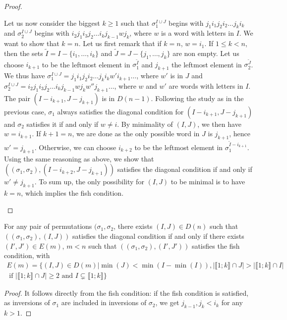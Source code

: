 \begin{proof}
\begin{itemize}
Let us now consider the biggest $k\geq 1$ such that $\sigma^{I \cup J}_1$ begins with $j_1 i_1 j_2 i_2 \ldots j_k i_k$ and $\sigma^{I \cup J}_2$ begins with $i_2 j_1 i_3 j_2\ldots i_k j_{k-1} w j_k$, where $w$ is a word with letters in $I$. We want to show that $k=n$. Let us first remark that if $k=n$, $w=i_1$. If $1\leq k<n$, then the sets $\tilde{I}=I-\{i_1, \ldots, i_k\}$ and $\tilde{J}=J-\{j_1, \ldots, j_k\}$ are non empty. Let us choose $i_{k+1}$ to be the leftmost element in $\sigma^{\tilde{I}}_1$ and $j_{k+1}$ the leftmost element in $\sigma^{\tilde{J}}_2$. We thus have $\sigma^{I \cup J}_1=j_1 i_1 j_2 i_2 \ldots j_k i_k w' i_{k+1}\ldots$, where $w'$ is in $J$ and $\sigma^{I \cup J}_2= i_2 j_1 i_3 j_2\ldots i_k j_{k-1} w j_k w'' j_{k+1}\ldots $, where $w$ and $w'$ are words with letters in $I$. The pair $(I-i_{k+1},J-j_{k+1})$ is in $D(n-1)$. Following the study as in the previous case, $\sigma_1$ always satisfies the diagonal condition for $(I-i_{k+1},J-j_{k+1})$ and $\sigma_2$ satisfies it if and only if $w \neq i$. By minimality of $(I,J)$, we then have $w=i_{k+1}$. If $k+1=n$, we are done as the only possible word in $J$ is $j_{k+1}$, hence $w'=j_{k+1}$. Otherwise, we can choose $i_{k+2}$ to be the leftmost element in $\sigma_1^{\tilde{I}-i_{k+1}}$. Using the same reasoning as above, we show that $((\sigma_1, \sigma_2),(I-i_{k+2},J-j_{k+1}))$ satisfies the diagonal condition if and only if $w'\neq j_{k+1}$. To sum up, the only possibility for $(I,J)$ to be minimal is to have $k=n$, which implies the fish condition.
\end{itemize}
\end{proof}

\begin{corollary} For any pair of permutations $(\sigma_1, \sigma_2$, there exists $(I,J) \in D(n)$ such that $((\sigma_1, \sigma_2),(I,J))$ satisfies the diagonal condition if and only if there exists $(I',J') \in E(m)$, $m<n$ such that $((\sigma_1, \sigma_2),(I',J'))$ satisfies the fish condition, with 
\begin{multline}
E(m)=\{(I,J)\in D(m)| \min(J)<\min(I-\min(I)), |\llbracket 1; k \rrbracket \cap J| > |\llbracket 1; k \rrbracket \cap I| \\ \text{ if } |\llbracket 1; k \rrbracket \cap J| \geq 2 \text{ and } I \subsetneq \llbracket 1; k \rrbracket \}
\end{multline}
\end{corollary}

\begin{proof}
It follows directly from the fish condition: if the fish condition is satisfied, as inversions of $\sigma_1$ are included in inversions of $\sigma_2$, we get $j_{k-1},j_k<i_k$ for any $k>1$.
\end{proof}



